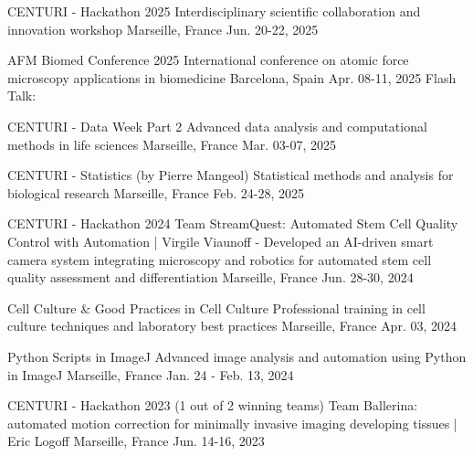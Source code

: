 
\begin{cventries}

    \cventry
    {CENTURI - Hackathon 2025}
    {Interdisciplinary scientific collaboration and innovation workshop}
    {Marseille, France}
    {Jun. 20-22, 2025}
    {}

    \cventry
    {AFM Biomed Conference 2025}
    {International conference on atomic force microscopy applications in biomedicine}
    {Barcelona, Spain}
    {Apr. 08-11, 2025}
    {Flash Talk: }

    \cventry
    {CENTURI - Data Week Part 2}
    {Advanced data analysis and computational methods in life sciences}
    {Marseille, France}
    {Mar. 03-07, 2025}
    {}

    \cventry
    {CENTURI - Statistics (by Pierre Mangeol)}
    {Statistical methods and analysis for biological research}
    {Marseille, France}
    {Feb. 24-28, 2025}
    {}

    \cventry
    {CENTURI - Hackathon 2024}
    {Team StreamQuest: Automated Stem Cell Quality Control with Automation | Virgile Viaunoff - Developed an AI-driven smart camera system integrating microscopy and robotics for automated stem cell quality assessment and differentiation}
    {Marseille, France}
    {Jun. 28-30, 2024}
    {}


    \cventry
    {Cell Culture \& Good Practices in Cell Culture}
    {Professional training in cell culture techniques and laboratory best practices}
    {Marseille, France}
    {Apr. 03, 2024}
    {}

    \cventry
    {Python Scripts in ImageJ}
    {Advanced image analysis and automation using Python in ImageJ}
    {Marseille, France}
    {Jan. 24 - Feb. 13, 2024}
    {}

    \cventry
    {CENTURI - Hackathon 2023 (1 out of 2 winning teams)}
    {Team Ballerina: automated motion correction for minimally invasive imaging developing tissues | Eric Logoff}
    {Marseille, France}
    {Jun. 14-16, 2023}
    {}

\end{cventries}

